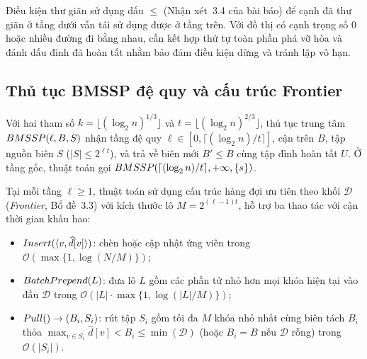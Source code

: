 Điều kiện thư giãn sử dụng dấu $\le$ (Nhận xét~3.4 của bài báo) để cạnh đã thư giãn ở tầng dưới vẫn tái sử dụng được ở tầng trên. Với đồ thị có cạnh trọng số $0$ hoặc nhiều đường đi bằng nhau, cần kết hợp thứ tự toàn phần phá vỡ hòa và đánh dấu đỉnh đã hoàn tất nhằm bảo đảm điều kiện dừng và tránh lặp vô hạn.

\subsection{Thủ tục BMSSP đệ quy và cấu trúc Frontier}

Với hai tham số $k = \lfloor (\log_2 n)^{1/3} \rfloor$ và $t = \lfloor (\log_2 n)^{2/3} \rfloor$, thủ tục trung tâm $\textsc{BMSSP}(\ell, B, S)$ nhận tầng đệ quy $\ell \in [0, \lceil (\log_2 n)/t \rceil]$, cận trên $B$, tập nguồn biên $S$ ($|S| \le 2^{\ell t}$), và trả về biên mới $B' \le B$ cùng tập đỉnh hoàn tất $U$. Ở tầng gốc, thuật toán gọi $\textsc{BMSSP}(\lceil (\log_2 n)/t \rceil, +\infty, \{s\})$.

Tại mỗi tầng $\ell \ge 1$, thuật toán sử dụng cấu trúc hàng đợi ưu tiên theo khối $\mathcal{D}$ (\textit{Frontier}, Bổ đề~3.3) với kích thước lô $M = 2^{(\ell - 1)t}$, hỗ trợ ba thao tác với cận thời gian khấu hao:
\begin{itemize}
    \item $\textsc{Insert}(\langle v, \widehat{d}[v] \rangle)$: chèn hoặc cập nhật ứng viên trong $\mathcal{O}(\max\{1, \log(N/M)\})$;
    \item $\textsc{BatchPrepend}(L)$: đưa lô $L$ gồm các phần tử nhỏ hơn mọi khóa hiện tại vào đầu $\mathcal{D}$ trong $\mathcal{O}(|L|\cdot\max\{1, \log(|L|/M)\})$;
    \item $\textsc{Pull}() \to (B_i, S_i)$: rút tập $S_i$ gồm tối đa $M$ khóa nhỏ nhất cùng biên tách $B_i$ thỏa $\max_{v \in S_i}\widehat{d}[v] < B_i \le \min(\mathcal{D})$ (hoặc $B_i = B$ nếu $\mathcal{D}$ rỗng) trong $\mathcal{O}(|S_i|)$.
\end{itemize}

